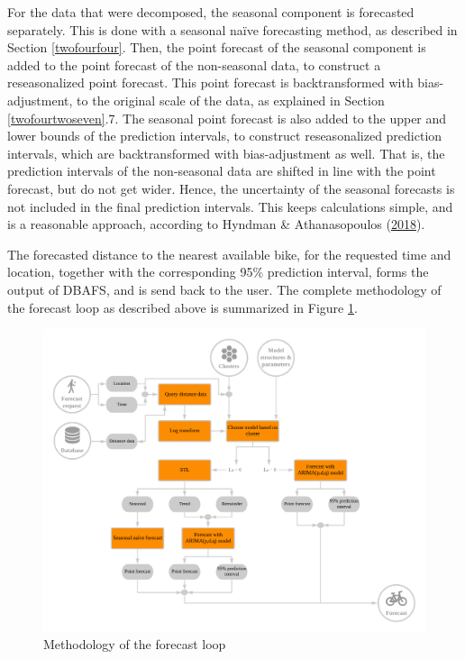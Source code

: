 \documentclass[12pt,oneside]{reedthesis}
\begin{document}
For the data that were decomposed, the seasonal component is forecasted
separately. This is done with a seasonal naïve forecasting method, as
described in Section \ref{twofourfour}. Then, the point forecast of the
seasonal component is added to the point forecast of the non-seasonal
data, to construct a reseasonalized point forecast. This point forecast
is backtransformed with bias-adjustment, to the original scale of the
data, as explained in Section \ref{twofourtwoseven}.7. The seasonal
point forecast is also added to the upper and lower bounds of the
prediction intervals, to construct reseasonalized prediction intervals,
which are backtransformed with bias-adjustment as well. That is, the
prediction intervals of the non-seasonal data are shifted in line with
the point forecast, but do not get wider. Hence, the uncertainty of the
seasonal forecasts is not included in the final prediction intervals.
This keeps calculations simple, and is a reasonable approach, according
to Hyndman \& Athanasopoulos
(\protect\hyperlink{ref-hyndman2018fpp}{2018}).

The forecasted distance to the nearest available bike, for the requested
time and location, together with the corresponding 95\% prediction
interval, forms the output of DBAFS, and is send back to the user. The
complete methodology of the forecast loop as described above is
summarized in Figure \ref{fig:forecastloop}.
\begin{figure}[h]
\includegraphics[width=\textwidth]{Figures/Forecastloop} \caption{Methodology of the forecast loop}\label{fig:forecastloop}
\end{figure}
\end{document}
